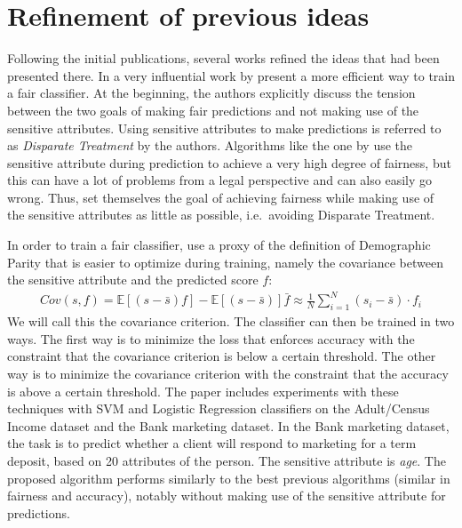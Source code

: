 \section{Refinement of previous ideas}%
\label{sec:refinement-on-previous-ideas-for-fair-classification-and-fair-representations}
Following the initial publications,
several works refined the ideas that had been presented there.
In a very influential work by \citet{zafar2017fairnessconstraints}
present a more efficient way to train a fair classifier.
At the beginning, the authors explicitly discuss the tension
between the two goals of making fair predictions and not making use of the sensitive attributes.
Using sensitive attributes to make predictions
is referred to as \emph{Disparate Treatment} by the authors.
Algorithms like the one by \citet{calders2009building} use the sensitive
attribute during prediction to achieve a very high degree of fairness, but this can have a
lot of problems from a legal perspective and can also easily go wrong.
Thus, \citet{zafar2017fairnessconstraints} set themselves the goal of achieving fairness while making use of the sensitive attributes
as little as possible, i.e.~avoiding Disparate Treatment.

In order to train a fair classifier, \citet{zafar2017fairnessconstraints} use a proxy of the definition of
Demographic Parity that is easier to optimize during training, namely the covariance
between the sensitive attribute and the predicted score \(f\):
\begin{align}
  \label{eq:zafar-constraint}
  Cov(s, f) = \mathbb{E}[(s - \bar{s})f] - \mathbb{E}[(s - \bar{s})]\bar{f} \approx 
  \frac{1}{N} \sum\limits_{i=1}^{N} (s_i - \bar{s}) \cdot f_i
\end{align}
We will call this the covariance criterion.
The classifier can then be trained in two ways.
The first way is to minimize the loss that enforces accuracy
with the constraint that the covariance criterion is below a certain threshold.
The other way is to minimize the covariance criterion
with the constraint that the accuracy is above a certain threshold.
The paper includes experiments with these techniques with SVM and Logistic Regression classifiers
on the Adult/Census Income dataset and the Bank marketing dataset.
In the Bank marketing dataset, the task is to predict whether a client will respond to marketing for a term deposit,
based on 20 attributes of the person.
The sensitive attribute is \emph{age}.
The proposed algorithm performs similarly to the best previous algorithms (similar in fairness and accuracy),
notably without making use of the sensitive attribute for predictions.

